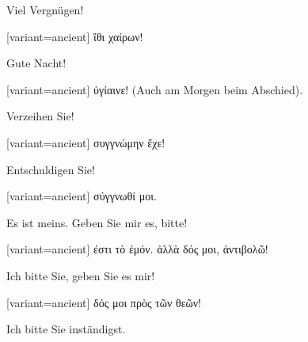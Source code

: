 Viel Vergnügen!

\switchcolumn

\begin{greek}[variant=ancient]%
ἴθι χαίρων!

\end{greek}%
\switchcolumn*

Gute Nacht!

\switchcolumn

\begin{greek}[variant=ancient]%
ὑγίαινε!\textgerman[spelling=old,babelshorthands=true]{ (Auch am Morgen
beim Abschied).}

\end{greek}%
\indent Verzeihen Sie!

\switchcolumn

\begin{greek}[variant=ancient]%
συγγνώμην ἔχε!

\end{greek}%
\switchcolumn*

Ent\textcompwordmark{}schuldigen Sie!

\switchcolumn

\begin{greek}[variant=ancient]%
σύγγνωθί μοι.

\end{greek}%
\switchcolumn*

Es ist meins. Geben Sie mir es, bitte!

\switchcolumn

\begin{greek}[variant=ancient]%
ἐστι τὸ ἐμόν. ἀλλὰ δός μοι, ἀντιβολῶ!

\end{greek}%
\switchcolumn*

Ich bitte Sie, geben Sie es mir!

\switchcolumn

\begin{greek}[variant=ancient]%
δός μοι πρὸς τῶν θεῶν!

\end{greek}%
\switchcolumn*

Ich bitte Sie inständigst.

\switchcolumn

